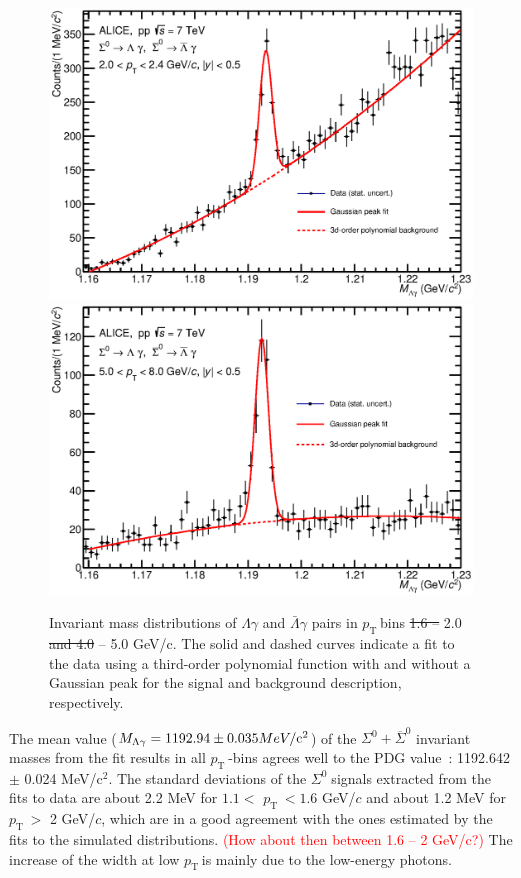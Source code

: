 \documentclass[ALICE,manyauthors]{cernphprep}
\newcommand{\sig}{\ensuremath{\Sigma^0  \; }}
\newcommand{\pt}{\ensuremath{p_{\mathrm{T}\; }}}
\newcommand{\red}{\textcolor{red}}
\providecommand{\DIFaddtex}[1]{{\protect\color{blue}\uwave{#1}}} %
\providecommand{\DIFdeltex}[1]{{\protect\color{red}\sout{#1}}}                      %
\providecommand{\DIFaddFL}[1]{\DIFadd{#1}} %
\providecommand{\DIFdelFL}[1]{\DIFdel{#1}} %
\providecommand{\DIFaddbeginFL}{} %
\providecommand{\DIFaddendFL}{} %
\providecommand{\DIFdelbeginFL}{} %
\providecommand{\DIFdelendFL}{} %
\providecommand{\DIFadd}[1]{\texorpdfstring{\DIFaddtex{#1}}{#1}} %
\providecommand{\DIFdel}[1]{\texorpdfstring{\DIFdeltex{#1}}{}} %
\begin{document}
\begin{figure}[h!]
\hspace*{-1.0cm}  \includegraphics[width=9.cm]{Figure/10jan18Minvbin3.eps}
\hspace*{-1.0cm}  \includegraphics[width=9.cm]{Figure/10jan18Minvbin8.eps}
\caption{
Invariant mass distributions of $\Lambda\gamma$ and $\bar \Lambda \gamma$ pairs in \pt bins \DIFdelbeginFL \DIFdelFL{1.6 -- }\DIFdelendFL 2.0 \DIFdelbeginFL \DIFdelFL{and 4.0 }\DIFdelendFL -- \DIFaddbeginFL \DIFaddFL{2.4 
and }\DIFaddendFL 5.0 \DIFaddbeginFL \DIFaddFL{-- 8.0 }\DIFaddendFL GeV/c. The solid and dashed curves indicate a fit to the data using a third-order polynomial 
function with and without a Gaussian peak for the signal and background description, respectively.
}
  \label{fig:InvMassSigma0}
\end{figure}

The mean value ($M_{\Lambda \gamma} = 1192.94 \pm 0.035 MeV/\rm{c}^2$) of the 
$\Sigma^0+ \overline{\Sigma}^{0}$ invariant masses from the fit results in all \pt-bins agrees
well to the PDG value~\cite{cite:PDG}: 1192.642 $\pm$ 0.024 MeV/c$^2$.
The standard deviations of the \sig signals extracted from the fits to data are about 2.2 MeV for 
$1.1 <$ \pt $< 1.6$ GeV/$c$ and about 1.2 MeV for \pt$>$ 2 GeV/$c$, which are in a good agreement 
with the ones estimated by the fits to the simulated distributions. \red{(How about then between 1.6 -- 2 GeV/c?)}
The increase of the width at low \pt is mainly due to the low-energy photons.
\end{document}
